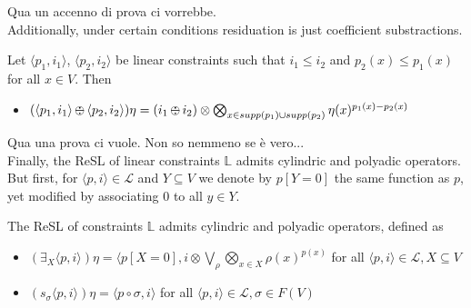\documentclass{llncs}
\def\odiv{\, {\ominus\hspace{-7.7pt} \div} \,}
\begin{document}
Qua un accenno di prova ci vorrebbe.
\\

Additionally, under certain conditions residuation is just coefficient substractions.

\begin{proposition}
Let $\langle p_1, i_1 \rangle$, $\langle p_2, i_2 \rangle$ be linear constraints such that
$i_1 \leq i_2$ and $p_2(x) \leq p_1(x)$ for all $x \in V$. Then

	\begin{itemize}
		\item $(\langle p_1, i_1 \rangle \odiv \langle p_2, i_2 \rangle)\eta = (i_1 \odiv i_2) \otimes \bigotimes_{x \in supp(p_1) \cup supp(p_2)} \eta(x)^{p_1(x) - p_2(x)}$
	\end{itemize}
\end{proposition}

Qua una prova ci vuole. Non so nemmeno se \`e vero...
\\

Finally, the ReSL of linear constraints $\mathbb{L}$ admits cylindric and polyadic operators. But first, for 
$ \langle p, i \rangle \in \mathcal{L}$ and $Y \subseteq V$ we denote by
$p[Y=0]$ the same function as $p$, yet modified by associating $0$ to all $y \in Y$.


\begin{lemma}
	The ReSL of constraints $\mathbb{L}$ admits cylindric and polyadic operators, defined as
	\begin{itemize}
		\item  $(\exists_X \langle p, i \rangle) \eta = \langle p[X = 0], i \otimes \bigvee_{\rho} \bigotimes_{x \in X} \rho(x)^{p(x)}$
		         for all $ \langle p, i \rangle \in \mathcal{L}, X \subseteq V$
		\item  $(s_\sigma \langle p, i \rangle) \eta = \langle p \circ \sigma, i \rangle$ for all $\langle p, i \rangle \in \mathcal{L}, \sigma \in F(V)$		
	\end{itemize}
\end{lemma}
\end{document}

